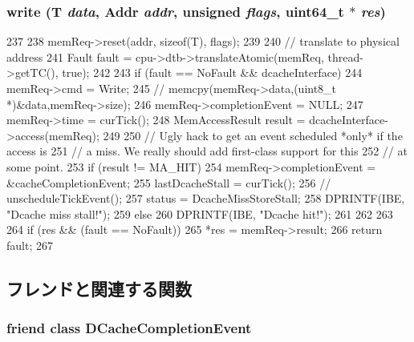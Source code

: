 \label{classInorderBackEnd_abbf7bcc93511421a1787650a43e2642a}
\hypertarget{classInorderBackEnd_ace3a2a0aed65c3714979fca6f51276f9}{
\subsubsection[{write}]{ write (T {\em data}, \/  {\bf Addr} {\em addr}, \/  unsigned {\em flags}, \/  uint64\_\-t $\ast$ {\em res})}}
\label{classInorderBackEnd_ace3a2a0aed65c3714979fca6f51276f9}



\begin{DoxyCode}
237 {
238     memReq->reset(addr, sizeof(T), flags);
239 
240     // translate to physical address
241     Fault fault = cpu->dtb->translateAtomic(memReq, thread->getTC(), true);
242 
243     if (fault == NoFault && dcacheInterface) {
244         memReq->cmd = Write;
245 //      memcpy(memReq->data,(uint8_t *)&data,memReq->size);
246         memReq->completionEvent = NULL;
247         memReq->time = curTick();
248         MemAccessResult result = dcacheInterface->access(memReq);
249 
250         // Ugly hack to get an event scheduled *only* if the access is
251         // a miss.  We really should add first-class support for this
252         // at some point.
253         if (result != MA_HIT) {
254             memReq->completionEvent = &cacheCompletionEvent;
255             lastDcacheStall = curTick();
256 //          unscheduleTickEvent();
257             status = DcacheMissStoreStall;
258             DPRINTF(IBE, "Dcache miss stall!\n");
259         } else {
260             DPRINTF(IBE, "Dcache hit!\n");
261         }
262     }
263 
264     if (res && (fault == NoFault))
265         *res = memReq->result;
266     return fault;
267 }
\end{DoxyCode}


\subsection{フレンドと関連する関数}
\hypertarget{classInorderBackEnd_a27227be5511e316f17702a3a99fb0b98}{
\subsubsection[{DCacheCompletionEvent}]{\setlength{\rightskip}{0pt plus 5cm}friend class {\bf DCacheCompletionEvent}}}
\label{classInorderBackEnd_a27227be5511e316f17702a3a99fb0b98}



